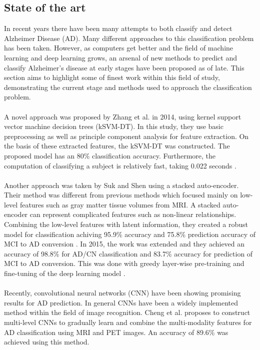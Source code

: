 \documentclass[12pt, fleqn, titlepage]{article}
\begin{document}
\subsection{State of the art}\label{statens_kunst}
In recent years there have been many attempts to both classify and detect Alzheimer Disease (AD). Many different approaches to this classification problem has been taken. However, as computers get better and the field of machine learning and deep learning grows, an arsenal of new methods to predict and classify Alzheimer's disease at early stages have been proposed as of late. This section aims to highlight some of finest work within this field of study, demonstrating the current stage and methods used to approach the classification problem. 
\\\\
\noindent
A novel approach was proposed by Zhang et al. in 2014, using kernel support vector machine decision trees (kSVM-DT). In this study, they use basic preprocessing as well as principle component analysis for feature extraction. On the basis of these extracted features, the kSVM-DT was constructed. The proposed model has an 80\% classification accuracy. Furthermore, the computation of classifying a subject is relatively fast, taking 0.022 seconds \cite{yudong}. 
\\\\
%
Another approach was taken by Suk and Shen using a stacked auto-encoder. Their method was different from previous methods which focused mainly on low-level features such as gray matter tissue volumes from MRI. A stacked auto-encoder can represent complicated features such as non-linear relationships. Combining the low-level features with latent information, they created a robust model for classification achiving 95.9\% accuracy and 75.8\% prediction accuracy of MCI to AD conversion \cite{suk_and_shen_1}. In 2015, the work was extended and they achieved an accuracy of  98.8\% for AD/CN classification and 83.7\% accuracy for prediction of MCI to AD conversion. This was done with greedy layer-wise pre-training and fine-tuning of the deep learning model \cite{suk_and_shen_2}.
\\\\
Recently, convolutional neural networks (CNN) have been showing promising results for AD prediction. In general CNNs have been a widely implemented method within the field of image recognition. Cheng et al. proposes to construct multi-level CNNs to gradually learn and combine the multi-modality features for AD classification using MRI and PET images. An accuracy of 89.6\% was achieved using this method. \cite{cheng}
\end{document}

